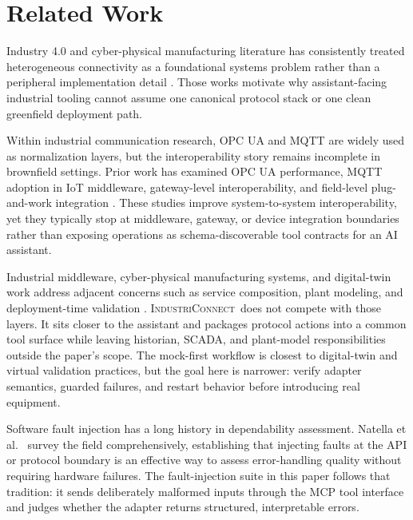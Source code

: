 \documentclass[conference]{IEEEtran}
\newcommand{\system}{\textsc{IndustriConnect}}
\begin{document}
\section{Related Work}
\label{sec:related}

Industry 4.0 and cyber-physical manufacturing literature has consistently treated heterogeneous connectivity as a foundational systems problem rather than a peripheral implementation detail \cite{lasi2014industry40,xu2018industry4,wollschlaeger2017future,lee2015cps,monostori2016cps,zhong2017intelligent,tilbury2019cpms}. Those works motivate why assistant-facing industrial tooling cannot assume one canonical protocol stack or one clean greenfield deployment path.

Within industrial communication research, OPC UA and MQTT are widely used as normalization layers, but the interoperability story remains incomplete in brownfield settings. Prior work has examined OPC UA performance, MQTT adoption in IoT middleware, gateway-level interoperability, and field-level plug-and-work integration \cite{cavalieri2013opcua,mishra2020mqtt,cavalieri2021onem2m,buechter2022plug}. These studies improve system-to-system interoperability, yet they typically stop at middleware, gateway, or device integration boundaries rather than exposing operations as schema-discoverable tool contracts for an AI assistant.

Industrial middleware, cyber-physical manufacturing systems, and digital-twin work address adjacent concerns such as service composition, plant modeling, and deployment-time validation \cite{tilbury2019cpms,fuller2020digital,lu2020digitaltwin}. \system\ does not compete with those layers. It sits closer to the assistant and packages protocol actions into a common tool surface while leaving historian, SCADA, and plant-model responsibilities outside the paper's scope. The mock-first workflow is closest to digital-twin and virtual validation practices, but the goal here is narrower: verify adapter semantics, guarded failures, and restart behavior before introducing real equipment.

Software fault injection has a long history in dependability assessment. Natella et al.~\cite{natella2016faultinjection} survey the field comprehensively, establishing that injecting faults at the API or protocol boundary is an effective way to assess error-handling quality without requiring hardware failures. The fault-injection suite in this paper follows that tradition: it sends deliberately malformed inputs through the MCP tool interface and judges whether the adapter returns structured, interpretable errors.
\end{document}
